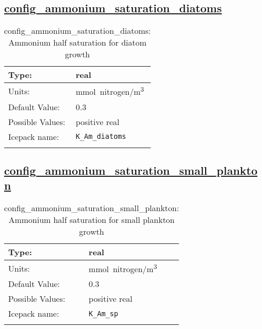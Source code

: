 \subsection[config\_ammonium\_saturation\_diatoms]{\hyperref[sec:nm_tab_biogeochemistry]{config\_ammonium\_saturation\_diatoms}}
\label{subsec:nm_sec_config_ammonium_saturation_diatoms}
\begin{center}
\begin{longtable}{| p{2.0in} || p{4.0in} |}
    \hline
    Type: & real \\
    \hline
    Units: & \si{mmol.nitrogen/m^3} \\
    \hline
    Default Value: & 0.3 \\
    \hline
    Possible Values: & positive real \\
    \hline
    Icepack name: & \verb+K_Am_diatoms+ \\
    \hline
    \caption{config\_ammonium\_saturation\_diatoms: Ammonium half saturation for diatom growth}
\end{longtable}
\end{center}
\subsection[config\_ammonium\_saturation\_small\_plankton]{\hyperref[sec:nm_tab_biogeochemistry]{config\_ammonium\_saturation\_small\_plankton}}
\label{subsec:nm_sec_config_ammonium_saturation_small_plankton}
\begin{center}
\begin{longtable}{| p{2.0in} || p{4.0in} |}
    \hline
    Type: & real \\
    \hline
    Units: & \si{mmol.nitrogen/m^3} \\
    \hline
    Default Value: & 0.3 \\
    \hline
    Possible Values: & positive real \\
    \hline
    Icepack name: & \verb+K_Am_sp+ \\
    \hline
    \caption{config\_ammonium\_saturation\_small\_plankton: Ammonium half saturation for small plankton growth}
\end{longtable}
\end{center}
